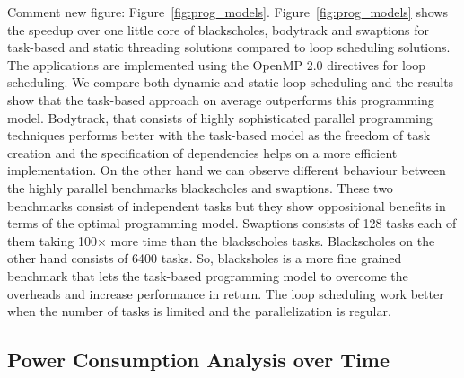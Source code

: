 Comment new figure: Figure~\ref{fig:prog_models}.
Figure~\ref{fig:prog_models} shows the speedup over one little core of blackscholes, bodytrack and swaptions for task-based and static threading solutions compared to loop scheduling solutions. 
The applications are implemented using the OpenMP 2.0 directives for loop scheduling. 
We compare both dynamic and static loop scheduling and the results show that the task-based approach on average outperforms this programming model.
Bodytrack, that consists of highly sophisticated parallel programming techniques performs better with the task-based model as the freedom of task creation and the specification of dependencies helps on a more efficient implementation. 
On the other hand we can observe different behaviour between the highly parallel benchmarks blackscholes and swaptions.
These two benchmarks consist of independent tasks but they show oppositional benefits in terms of the optimal programming model.
Swaptions consists of 128 tasks each of them taking 100$\times$ more time than the blackscholes tasks. 
Blackscholes on the other hand consists of 6400 tasks. 
So, blacksholes is a more fine grained benchmark that lets the task-based programming model to overcome the overheads and increase performance in return.
The loop scheduling work better when the number of tasks is limited and the parallelization is regular.
\fi

\subsection{Power Consumption Analysis over Time}


